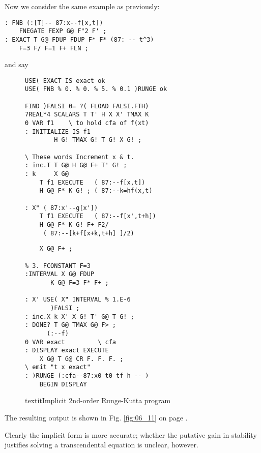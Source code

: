 Now we consider the same example as previously:

\begin{lstlisting}
: FNB (:[T]-- 87:x--f[x,t])
    FNEGATE FEXP G@ F"2 F' ;
: EXACT T G@ FDUP FDUP F* F* (87: -- t^3)
    F=3 F/ F=1 F+ FLN ;
\end{lstlisting}

and say
\begin{figure}
    \tiny
    \begin{tcolorbox} [sidebyside, colback=white, sharp corners, enhanced, segmentation style=solid]
    \begin{lstlisting}
USE( EXACT IS exact ok
USE( FNB % 0. % 0. % 5. % 0.1 )RUNGE ok

FIND )FALSI 0= ?( FLOAD FALSI.FTH)
7REAL*4 SCALARS T T' H X X' TMAX K
0 VAR f1    \ to hold cfa of f(xt)
: INITIALIZE IS f1
        H G! TMAX G! T G! X G! ;

\ These words Increment x & t.
: inc.T T G@ H G@ F+ T' G! ;
: k     X G@
    T f1 EXECUTE   ( 87:--f[x,t])
    H G@ F* K G! ; ( 87:--k=hf(x,t)

: X" ( 87:x'--g[x'])
    T f1 EXECUTE   ( 87:--f[x',t+h])
    H G@ F* K G! F+ F2/
     ( 87:--[k+f[x+k,t+h] ]/2)
    \end{lstlisting}
\tcblower
    \begin{lstlisting}
    X G@ F+ ;

% 3. FCONSTANT F=3
:INTERVAL X G@ FDUP
       K G@ F=3 F* F+ ;

: X' USE( X" INTERVAL % 1.E-6
       )FALSI ;
: inc.X k X' X G! T' G@ T G! ;
: DONE? T G@ TMAX G@ F> ;
      (:--f)
0 VAR exact         \ cfa
: DISPLAY exact EXECUTE
    X G@ T G@ CR F. F. F. ;
\ emit "t x exact"
: )RUNGE (:cfa--87:x0 t0 tf h -- )
    BEGIN DISPLAY
    \end{lstlisting}
    \end{tcolorbox}
    \caption{textit{Implicit 2nd-order Runge-Kutta program}}
    \label{fig:06_07}
\end{figure}

The resulting output is shown in Fig. \ref{fig:06_11} on page \pageref{fig:06_11}.

Clearly the implicit form is more accurate; whether the putative gain in stability justifies solving a transcendental equation is unclear, however.

